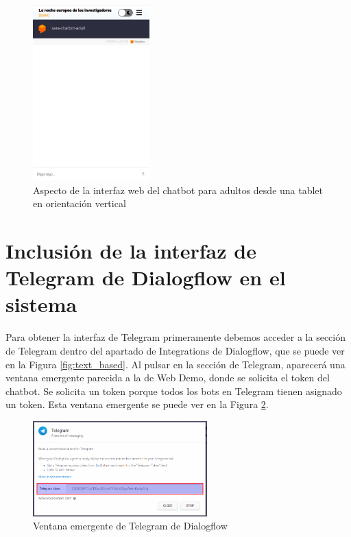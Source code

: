 \begin{figure}[h]
\centering
\includegraphics[width=0.4\textwidth]{imagenes/07_Implementacion/interfaz_web.png}
\caption{Aspecto de la interfaz web del chatbot para adultos desde una tablet en orientación vertical}
\label{fig:interfaz_web}
\end{figure}


\section{Inclusión de la interfaz de Telegram de Dialogflow en el sistema} \label{sec:inclu_interfaz_telegram}

Para obtener la interfaz de Telegram primeramente debemos acceder a la sección de Telegram dentro del apartado de Integrations de Dialogflow, que se puede ver en la Figura \ref{fig:text_based}. Al pulsar en la sección de Telegram, aparecerá una ventana emergente parecida a la de Web Demo, donde se solicita el token del chatbot. Se solicita un token porque todos los bots en Telegram tienen asignado un token. Esta ventana emergente se puede ver en la Figura \ref{fig:token_telegram}.

\begin{figure}[h]
\centering
\includegraphics[width=0.6\textwidth]{imagenes/07_Implementacion/token_telegram.png}
\caption{Ventana emergente de Telegram de Dialogflow}
\label{fig:token_telegram}
\end{figure}

